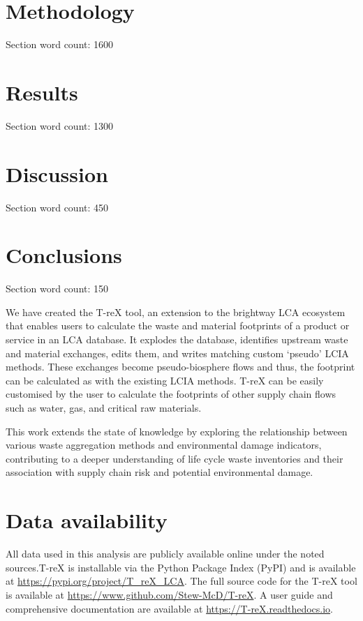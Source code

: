 \documentclass[review,3p,authoryear]{elsarticle}
\newcommand{\cbox}[1]{
    \begin{tcolorbox}[hbox, colback=red!5!white, colframe=red!65!black, boxrule=0.25pt, boxsep=2pt, left=2pt, right=2pt, top=1pt, bottom=1pt]
        \small\sffamily #1
    \end{tcolorbox}
}
\begin{document}
\section{Methodology}
\label{sec:methodology}
\cbox{Section word count: 1600}


\section{Results}
\cbox{Section word count: 1300}
\label{sec:results}


\section{Discussion}
\label{sec:discussion}
\cbox{Section word count: 450}


\section{Conclusions}
\label{sec:conclusions}
\cbox{Section word count: 150}
We have created the T-reX tool, an extension to the brightway LCA ecosystem that enables users to calculate the waste and material footprints of a product or service in an LCA database. It explodes the database, identifies upstream waste and material exchanges, edits them, and writes matching custom `pseudo' LCIA methods. These exchanges become pseudo-biosphere flows and thus, the footprint can be calculated as with the existing LCIA methods. T-reX can be easily customised by the user to calculate the footprints of other supply chain flows such as water, gas, and critical raw materials.

This work extends the state of knowledge by exploring the relationship between various waste aggregation methods and environmental damage indicators, contributing to a deeper understanding of life cycle waste inventories and their association with supply chain risk and potential environmental damage.


\section*{Data availability} 
All data used in this analysis are publicly available online under the noted sources.T-reX is installable via the Python Package Index (PyPI) and is available at \url{https://pypi.org/project/T_reX_LCA}.
The full source code for the T-reX tool is available at \url{https://www.github.com/Stew-McD/T-reX}.
A user guide and comprehensive documentation are available at \url{https://T-reX.readthedocs.io}.
\end{document}
